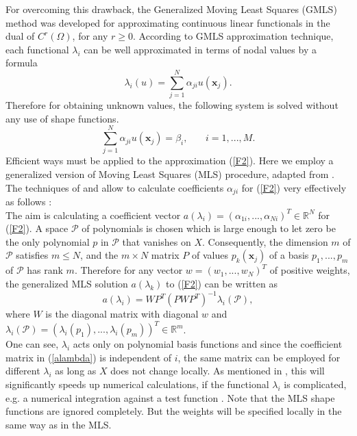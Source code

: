 \documentclass[12pt]{article}
\numberwithin{equation}{section}
\begin{document}
For overcoming this drawback, the Generalized Moving Least Squares (GMLS) method \cite{Mirzaei1} was developed for approximating continuous linear functionals in the dual of $C^{r}(\Omega)$, for any $r\geq0$.
According to GMLS approximation technique, each
functional ${\lambda _i}$ can be well approximated in terms of nodal values by a formula
\begin{equation}\label{F2}
{\lambda _i}(u) = \sum\limits_{j = 1}^N {{\alpha _{ji}}u({\mathbf{x}_j})}.
\end{equation}
Therefore for obtaining unknown values, the following system is solved without any use of shape functions.
\begin{equation}
\sum\limits_{j = 1}^N {{\alpha _{ji}}u({\mathbf{x}_j})}  = {\beta _i},\,\,\,\,\,\,\,\,\,\,\,i=1,...,M.
\end{equation}
Efficient ways must be applied to the approximation (\ref{F2}). Here we employ a generalized version of Moving Least Squares (MLS) procedure, adapted from \cite{Mirzaei1}.\\
The techniques of \cite{Mirzaei1} and \cite{Mirzaei} allow to calculate coefficients ${{\alpha _{ji}}}$ for (\ref{F2}) very effectively as follows \cite{MirzaeiH}:\\
The aim is calculating a coefficient vector $a({\lambda _i}) = {({\alpha _{1i}},...,{\alpha _{Ni}})^T} \in \mathbb{R}^{N}$
for (\ref{F2}). A space $\mathcal{P}$ of polynomials is chosen which is large enough
to let zero be the only polynomial $p$ in $\mathcal{P}$ that vanishes on $X$. Consequently, the
dimension $m$ of $\mathcal{P}$ satisfies $m\leq N$, and the $m \times N$ matrix $P$ of values $p_{k}(\mathbf{x}_{j})$ of
a basis ${p_1},...,{p_m}$ of $\mathcal{P}$ has rank $m$. Therefore for any vector $w = {({w_1},...,{w_N})^T}$ of
positive weights, the generalized MLS solution $a({\lambda _k})$ to (\ref{F2}) can be written as \cite{MirzaeiH}
\begin{equation}\label{alambda}
a({\lambda _i}) = W{P^T}{(PW{P^T})^{ - 1}}{\lambda _i}(\mathcal{P}),
\end{equation}
where $W$ is the diagonal matrix with diagonal $w$ and
${\lambda _i}(\mathcal{P}) = {({\lambda _i}({p_1}),...,{\lambda _i}({p_m}))^T} \in \mathbb{R}^{m}$.\\
One can see, ${\lambda _i}$ acts only on polynomial basis functions and since the coefficient
matrix in (\ref{alambda}) is independent of $i$, the same matrix can be employed for different ${\lambda _i}$ as long
as $X$ does not change locally. As mentioned in \cite{MirzaeiH}, this will significantly speeds up numerical calculations,
if the functional ${\lambda _i}$ is complicated, e.g. a numerical integration against a test function \cite{MirzaeiH}. Note that the MLS shape functions are ignored completely. But the
weights will be specified locally in the same way as in the MLS.
\end{document}

